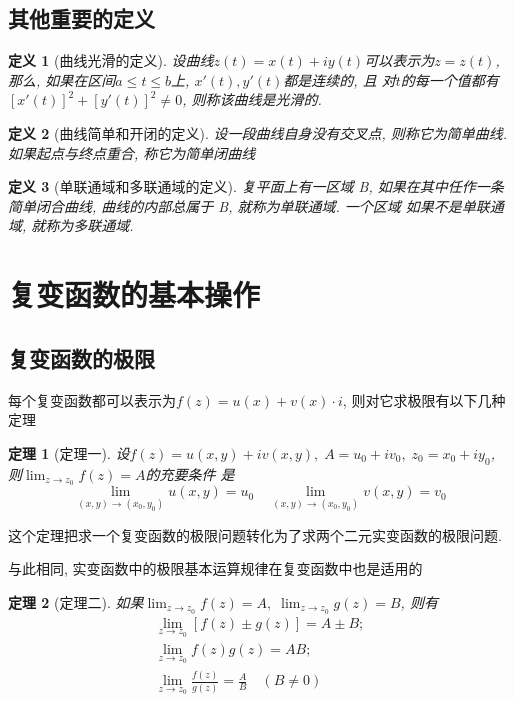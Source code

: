 \documentclass[12pt, a4paper, oneside]{ctexart}
\newtheorem{theorem}{定理}[section]
\newtheorem{definition}{定义}[section]
\begin{document}
\subsection{其他重要的定义}
\begin{definition}[曲线光滑的定义]

    设曲线$z(t)=x(t)+iy(t)$可以表示为$z=z(t)$, 那么, 如果在区间$a\leq t \leq b$上, $x'(t), y'(t)$都是连续的, 且
对$t$的每一个值都有$[x'(t)]^{2}+[y'(t)]^{2}\neq0$, 则称该曲线是光滑的.
\end{definition}


\begin{definition}[曲线简单和开闭的定义]
    设一段曲线自身没有交叉点, 则称它为简单曲线. 如果起点与终点重合, 称它为简单闭曲线
\end{definition}

\begin{definition}[单联通域和多联通域的定义]
    复平面上有一区域 B, 如果在其中任作一条简单闭合曲线, 曲线的内部总属于 B, 就称为单联通域. 一个区域
如果不是单联通域, 就称为多联通域.
\end{definition}

\section{复变函数的基本操作}
\subsection{复变函数的极限}

每个复变函数都可以表示为$f(z)=u(x)+v(x)\cdot i$, 则对它求极限有以下几种定理

\begin{theorem}[定理一]
    设$f(z)=u(x,y)+iv(x,y),\; A=u_{0}+iv_{0},\; z_{0}=x_{0}+iy_{0}$, 则$\lim_{z\to z_{0}}f(z)=A$的充要条件
    是
    \[
        \lim_{ (x,y)\to(x_{0},y_{0}) } u(x,y)=u_{0} \quad \lim_{(x,y)\to(x_{0},y_{0}) }v(x,y)=v_{0}
    \]
\end{theorem}

这个定理把求一个复变函数的极限问题转化为了求两个二元实变函数的极限问题.

与此相同, 实变函数中的极限基本运算规律在复变函数中也是适用的
\begin{theorem}[定理二]
    如果$\lim_{z\to z_{0}}f(z)=A,\;\lim_{z\to z_{0}}g(z)=B$, 则有
    \begin{align}
        \lim_{z\to z_{0}} [f(z)\pm g(z)] = A \pm B; \\
        \lim_{z\to z_{0}} f(z)g(z)=AB;\\
        \lim_{z\to z_{0}} \frac{f(z)}{g(z)}=\frac{A}{B} \quad (B\neq0)
    \end{align}   

\end{theorem}
\end{document}

